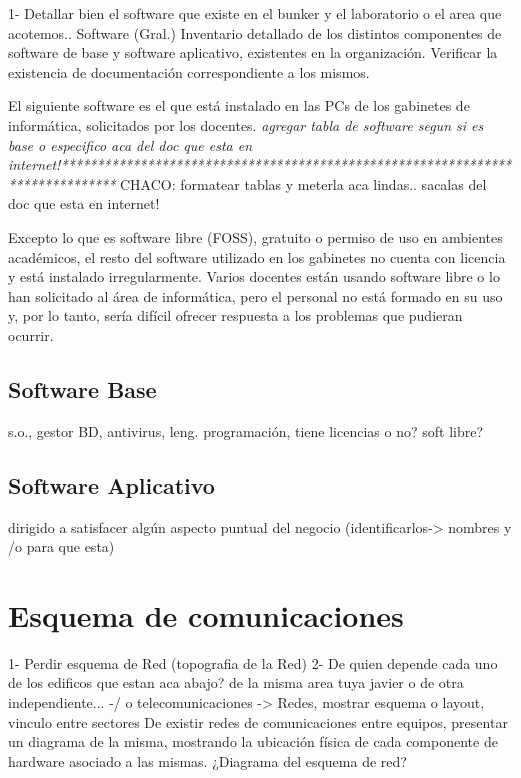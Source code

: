 \documentclass[10pt,a4paper,final]{article}
\begin{document}
1- Detallar bien el software que existe en el bunker y el laboratorio o el area que acotemos..
Software (Gral.)
Inventario detallado de los distintos componentes de software de base y software aplicativo, existentes en la organización.
Verificar la existencia de documentación correspondiente a los mismos.


El siguiente software es el que está instalado en las PCs de los gabinetes de informática, solicitados por los docentes. 
\emph{agregar tabla de software segun si es base o especifico aca del doc que esta en internet!******************************************************************************}
CHACO: formatear tablas y meterla aca lindas.. sacalas del doc que esta en internet!

Excepto lo que es software libre (FOSS), gratuito o permiso de uso en ambientes académicos, el resto del software utilizado en los gabinetes no cuenta con licencia y está instalado irregularmente. Varios docentes están usando software libre o lo han solicitado al área de informática, pero el personal no está formado en su uso y, por lo tanto, sería difícil ofrecer respuesta a los problemas que pudieran ocurrir.

\subsection{Software Base}
s.o., gestor BD, antivirus, leng. programación, tiene licencias o no? soft libre?

\subsection{Software Aplicativo}
dirigido a satisfacer algún aspecto puntual del negocio (identificarlos-> nombres y /o para que esta)

\section{Esquema de comunicaciones}
1- Perdir esquema de Red (topografia de la Red)
2- De quien depende cada uno de los edificos que estan aca abajo? de la misma area tuya javier o de otra independiente...
-/ o telecomunicaciones -> Redes, mostrar esquema o layout, vinculo entre sectores
 De existir redes de comunicaciones entre equipos, presentar un diagrama de la misma, mostrando la ubicación física de cada componente de hardware asociado a las mismas.
¿Diagrama del esquema de red?
\end{document}
